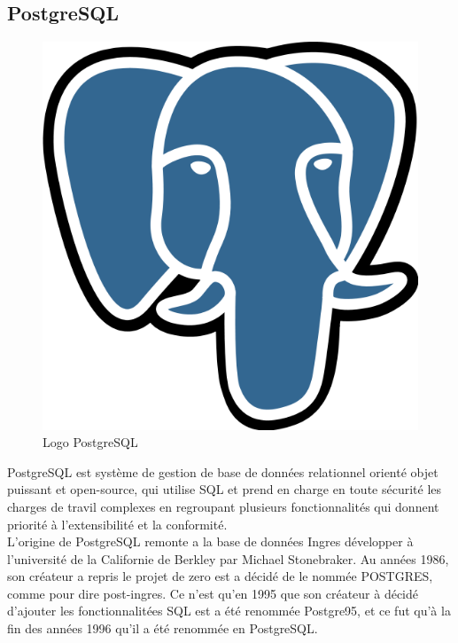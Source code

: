     \subsection{PostgreSQL}
    \begin{figure}[H]
        \centering
        \includegraphics[scale=0.2]{ACR/postgresql.png}
        \caption{Logo PostgreSQL}
    \end{figure}
    
    PostgreSQL\cite{postgres} est système de gestion de base de données relationnel orienté objet puissant et open-source, qui utilise \acs{SQL} et prend en charge en toute sécurité les charges de travil complexes en regroupant plusieurs fonctionnalités qui donnent priorité à l'extensibilité et la conformité.\\

    L'origine de PostgreSQL remonte a la base de données Ingres développer à l'université de la Californie de Berkley par Michael Stonebraker. Au années 1986, son créateur a repris le projet de zero est a décidé de le nommée POSTGRES, comme pour dire post-ingres. Ce n'est qu'en 1995 que son créateur à décidé d'ajouter les fonctionnalitées \acs{SQL} est a été renommée Postgre95, et ce fut qu'à la fin des années 1996 qu'il a été renommée en PostgreSQL.\\
    

